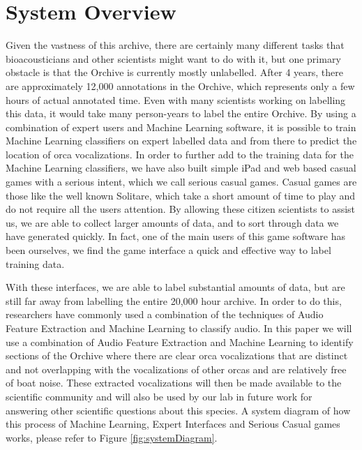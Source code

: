 \documentclass[12pt,oneside]{book}
\begin{document}

\label{chapter:softwareAndSystems}


\section{System Overview}
\label{section:softwareAndSystems:systemOverview}

Given the vastness of this archive, there are certainly many different
tasks that bioacousticians and other scientists might want to do with
it, but one primary obstacle is that the Orchive is currently mostly
unlabelled.  After 4 years, there are approximately 12,000 annotations
in the Orchive, which represents only a few hours of actual annotated
time.  Even with many scientists working on labelling this data, it
would take many person-years to label the entire Orchive.  By using a
combination of expert users and Machine Learning software, it is
possible to train Machine Learning classifiers on expert labelled data
and from there to predict the location of orca vocalizations.  In
order to further add to the training data for the Machine Learning
classifiers, we have also built simple iPad and web based casual games
with a serious intent, which we call serious casual games.  Casual
games are those like the well known Solitare, which take a short
amount of time to play and do not require all the users attention.  By
allowing these citizen scientists to assist us, we are able to collect
larger amounts of data, and to sort through data we have generated
quickly.  In fact, one of the main users of this game software has
been ourselves, we find the game interface a quick and effective way
to label training data.

With these interfaces, we are able to label substantial amounts of
data, but are still far away from labelling the entire 20,000 hour
archive.  In order to do this, researchers have commonly used a
combination of the techniques of Audio Feature Extraction and Machine
Learning to classify audio.  In this paper we will use a combination
of Audio Feature Extraction and Machine Learning to identify sections
of the Orchive where there are clear orca vocalizations that are
distinct and not overlapping with the vocalizations of other orcas and
are relatively free of boat noise. These extracted vocalizations will
then be made available to the scientific community and will also be
used by our lab in future work for answering other scientific
questions about this species.  A system diagram of how this process of
Machine Learning, Expert Interfaces and Serious Casual games works,
please refer to Figure \ref{fig:systemDiagram}.
\end{document}
